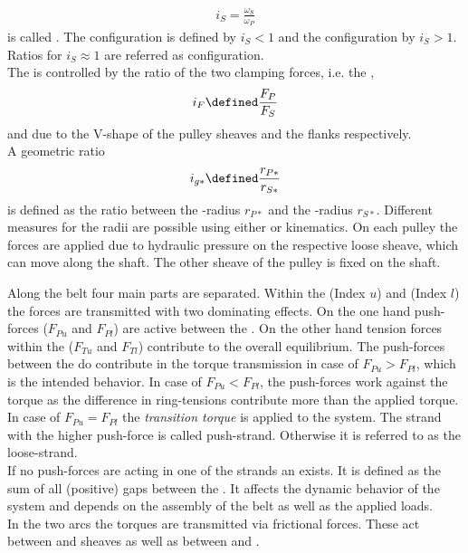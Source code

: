 %
\begin{align}
  \label{eq:speedratio}
  i_S = \frac{\omega_S}{\omega_P}
\end{align}
%
is called \SR.
The \UD configuration is defined by $i_S < 1$ and the \OD configuration by $i_S > 1$.
Ratios for $i_S \approx 1$ are referred as \MED configuration.\\
The \SR is controlled by the ratio of the two clamping forces, i.e. the \TR,
%
\begin{align}
  \label{eq:ThrustRatio}
  i_F \defined \frac{F_P}{F_S}
\end{align}
%
and due to the V-shape of the pulley sheaves and the \el flanks respectively.\\
A geometric ratio
%
\begin{align}
  \label{eq:GeometricRatioGeneral}
  i_{g*} \defined \frac{r_{P*}}{r_{S*}}
\end{align}
%
is defined as the ratio between the \PRI-radius $r_{P*}$ and the \SEC-radius $r_{S*}$.
Different measures for the radii are possible using either \ring or \el kinematics. 
On each pulley the forces are applied due to hydraulic pressure on the respective loose sheave, which can move along the shaft.
The other sheave of the pulley is fixed on the shaft.\par
%
Along the belt four main parts are separated.
Within the \US (Index $u$) and \LS (Index $l$) the forces are transmitted with two dominating effects. 
On the one hand push-forces ($F_{Pu}$ and $F_{Pl}$) are active between the \els.
On the other hand tension forces within the \rings ($F_{Tu}$ and $F_{Tl}$) contribute to the overall equilibrium.
The push-forces between the \els do contribute in the torque transmission in case of $F_{Pu} > F_{Pl}$, which is the intended behavior.
In case of $F_{Pu} < F_{Pl}$, the push-forces work against the torque as the difference in ring-tensions contribute more than the applied torque.
In case of $F_{Pu} = F_{Pl}$ the \emph{transition torque} is applied to the system.
The strand with the higher push-force is called push-strand.
Otherwise it is referred to as the loose-strand.\\
If no push-forces are acting in one of the strands an \OEP exists.
It is defined as the sum of all (positive) gaps between the \els.
It affects the dynamic behavior of the system and depends on the assembly of the belt as well as the applied loads.\\
In the two arcs the torques are transmitted via frictional forces.
These act between \els and sheaves as well as between \els and \rings.
